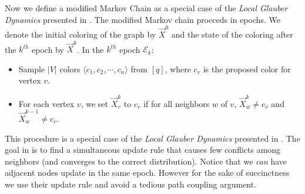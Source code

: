 Now we define a modified Markov Chain as a special case of the \emph{Local Glauber Dynamics} presented in \cite{mohsen}.
The modified Markov chain procceds in epochs.
We denote the initial coloring of the graph by $\vec X^0$ and the state of the coloring after the $k^{th}$ epoch by $\vec X^k$.
In the $k^{th}$ epoch $\mathcal E_k$:
\begin{itemize}
    \item Sample $|V|$ colors $ \langle c_1, c_2,\cdots, c_n \rangle$ from $[q]$, where $c_v$ is the proposed color for vertex $v$.
    \item For each vertex $v$, we set $\vec X^k_v$ to $c_v$ if for all neighbors $w$ of $v$, $\vec X^k_w\not=c_v$ and $\vec X^{k-1}_w\not=c_v$.
\end{itemize}

This procedure is a special case of the \emph{Local Glauber Dynamics} presented in \cite{mohsen}.
The goal in \cite{mohsen} is to find a simultaneous update rule that causes few conflicts among neighbors (and converges to the correct distribution).
Notice that we \emph{can} have adjacent nodes update in the same epoch.
However for the sake of succinctness we use their update rule and avoid a tedious path coupling argument.


